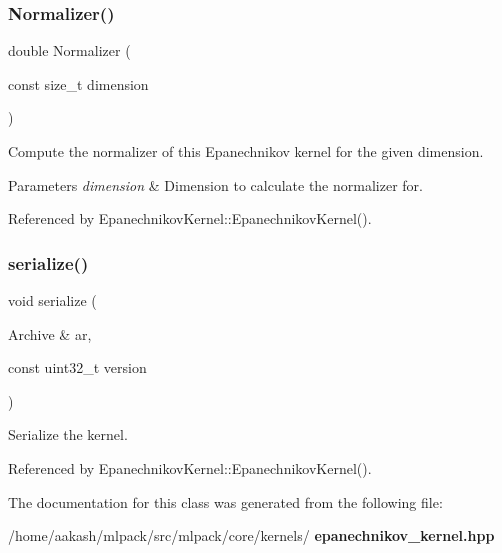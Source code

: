 \subsubsection{Normalizer()}
{\footnotesize\ttfamily double Normalizer (\begin{DoxyParamCaption}\item[{const size\+\_\+t}]{dimension }\end{DoxyParamCaption})}



Compute the normalizer of this Epanechnikov kernel for the given dimension. 


\begin{DoxyParams}{Parameters}
{\em dimension} & Dimension to calculate the normalizer for. \\
\hline
\end{DoxyParams}


Referenced by Epanechnikov\+Kernel\+::\+Epanechnikov\+Kernel().

\mbox{\label{classmlpack_1_1kernel_1_1EpanechnikovKernel_a72d63b74c8166dff8e1a9006905ad9ca}} 
\subsubsection{serialize()}
{\footnotesize\ttfamily void serialize (\begin{DoxyParamCaption}\item[{Archive \&}]{ar,  }\item[{const uint32\+\_\+t}]{version }\end{DoxyParamCaption})}



Serialize the kernel. 



Referenced by Epanechnikov\+Kernel\+::\+Epanechnikov\+Kernel().



The documentation for this class was generated from the following file\+:\begin{DoxyCompactItemize}
\item 
/home/aakash/mlpack/src/mlpack/core/kernels/\textbf{ epanechnikov\+\_\+kernel.\+hpp}\end{DoxyCompactItemize}
